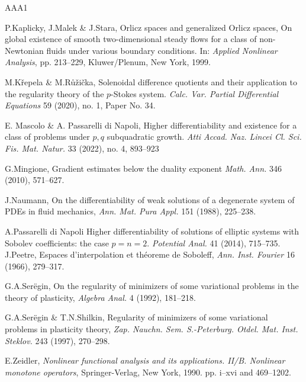 \documentclass[leqno,11pt]{amsart}%
\numberwithin{equation}{section}
\theoremstyle{definition}
\numberwithin{equation}{section}
\begin{document}
\begin{thebibliography}{AAA1}
 


  P.Kaplicky, J.Malek \& J.Stara,
  Orlicz spaces and generalized Orlicz spaces,
  On global existence of smooth two-dimensional steady flows for a
class of non-Newtonian fluids under various boundary conditions. In:\textit{ Applied Nonlinear Analysis},  pp.
213--229, Kluwer/Plenum, New York, 1999.



  M.K\v repela \& M.R\r u\v zi\v cka,
  \newblock Solenoidal difference quotients and their application to
  the regularity theory of the $p$-Stokes system.
  \newblock \textit{Calc. Var. Partial Differential Equations}
  59 (2020), no. 1, Paper No. 34.
 



 E. Mascolo \& A. Passarelli di Napoli, \newblock Higher differentiability and existence for a class of problems under $p,q$ subquadratic growth. \newblock \textit{Atti Accad. Naz. Lincei Cl. Sci. Fis. Mat. Natur.} 33 (2022), no. 4,  893--923

  G.Mingione, \newblock Gradient estimates below the duality exponent \newblock \textit{ Math. Ann.} 346 (2010), 571--627.

  J.Naumann, \newblock
On the differentiability of weak solutions of a degenerate system of
PDEs in fluid mechanics,
\newblock \textit{Ann. Mat. Pura Appl.} 151 (1988), 225--238. 

 A.Passarelli di Napoli \newblock Higher differentiability of solutions of elliptic systems with Sobolev coefficients:
the case $p=n=2$. \newblock \textit{Potential Anal.} 41 (2014), 715--735.
J.Peetre, Espaces d'interpolation et th\'eoreme de Soboleff, 
\textit{Ann. Inst. Fourier} 16 (1966),  279--317.
 

G.A.Ser\"egin,
 On the regularity of minimizers of some variational problems in the theory of plasticity, 
\textit{Algebra Anal.} 4 (1992),  181--218.


G.A.Ser\"egin \& T.N.Shilkin,
Regularity of minimizers of some variational problems in plasticity theory, 
\textit{Zap. Nauchn. Sem. S.-Peterburg. Otdel. Mat. Inst. Steklov.} 243 (1997),  270--298.

 
E.Zeidler,
\newblock \textit{Nonlinear functional analysis and its applications. II/B. Nonlinear monotone operators},
\newblock Springer-Verlag, New York, 1990. pp. i–xvi and 469--1202. 



\end{thebibliography}
\end{document}
